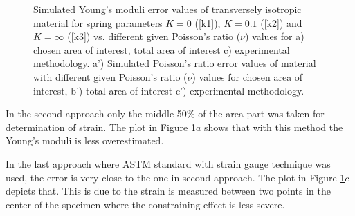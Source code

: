 \documentclass[review]{elsarticle}
\begin{document}
\begin{center}
\begin{figure}[h]
\captionsetup{justification=centering}
\caption{Simulated Young's moduli error values of transversely isotropic
material for spring parameters $K=0$ (\ref{k1}), $K=0.1$ (\ref{k2}) and
$K=\infty$ (\ref{k3}) vs.
different given Poisson's ratio ($\nu$) values for a) chosen area of
interest, total area of interest c) experimental methodology.
a') Simulated Poisson's ratio error values of material with different given
Poisson's ratio ($\nu$) values for chosen area of
interest, b') total area of interest c') experimental methodology.
}
\label{fig:strainmethods}


\end{figure}
\end{center}



In the second approach only the middle 50\% of the area part was
taken for determination of strain. The plot in Figure \ref{fig:strainmethods}$a$
shows that with this method the Young's moduli is less overestimated.\par
  In the last approach where ASTM standard
with strain gauge technique was used, the error is very close to the one in
second approach. The plot in Figure \ref{fig:strainmethods}$c$ depicts that.
This is due to the strain is measured between two points in the center of 
the specimen where the constraining effect is less severe. 
\end{document}
